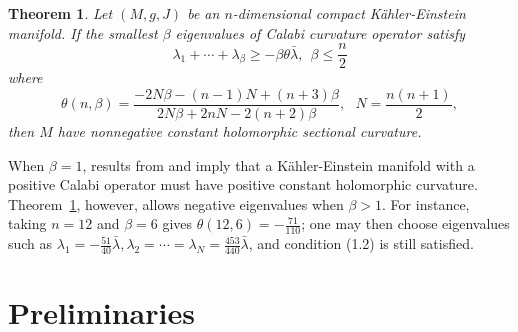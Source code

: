 \documentclass{amsart}
\newtheorem{theorem}{Theorem}[section]
\theoremstyle{definition}
\theoremstyle{remark}
\numberwithin{equation}{section}
\begin{document}
\begin{theorem}
\label{theorem1.4}
Let $\left( {M,g,J} \right)$ be an $n$-dimensional compact K{\"a}hler-Einstein manifold. If the smallest $\beta $ eigenvalues of Calabi curvature operator satisfy
\begin{equation}
\label{equation1.2}
{\lambda _1} +  \cdots  + {\lambda _\beta } \ge  - \beta \theta \bar \lambda, \ \ \beta \le \frac{n}{2}
\end{equation}
where
$$\theta \left( {n,\beta } \right) = \frac{{ - 2N \beta - \left( {n - 1} \right)N + \left( {n + 3} \right)\beta }}{{2N \beta  + 2nN - 2\left( {n + 2} \right)\beta}},\ \ \ N = \frac{{n\left( {n + 1} \right)}}{2},$$
then $M$ have nonnegative constant holomorphic sectional curvature.
\end{theorem}
When $\beta =1$, results from \cite{siu1980compact} and \cite{matsushima1957structure} imply that a K{\"a}hler-Einstein manifold with a positive Calabi operator must have positive constant holomorphic curvature. Theorem~\ref{theorem1.4}, however, allows negative eigenvalues when $\beta >1$. For instance, taking $n=12$ and $\beta =6$ gives $\theta \left( {12,6} \right) = - \frac{71}{110}$; one may then choose eigenvalues such as  ${\lambda _1} =  - \frac{51}{40} \bar \lambda,{\lambda _2} = \cdots= {\lambda _N} = \frac{453}{440} \bar \lambda$, and condition (1.2) is still satisfied.


\section{Preliminaries}
\end{document}

